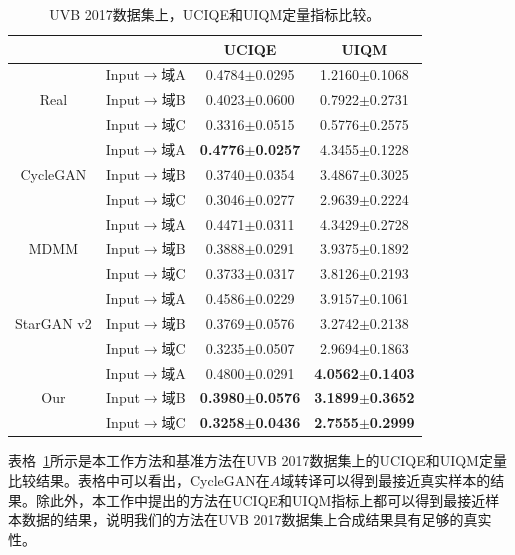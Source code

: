 \begin{table}[htp]
  \centering
  \caption{UVB 2017数据集上，UCIQE和UIQM定量指标比较。}
    \begin{tabular}{c|c|cc}
    \toprule
    \multicolumn{2}{c|}{} & \multicolumn{1}{c}{UCIQE} & UIQM \\
    \midrule
    \multirow{3}[2]{*}{Real} & Input$\rightarrow$域A & 0.4784$\pm$0.0295 & 1.2160$\pm$0.1068 \\
                             & Input$\rightarrow$域B & 0.4023$\pm$0.0600 & 0.7922$\pm$0.2731 \\
                             & Input$\rightarrow$域C & 0.3316$\pm$0.0515 & 0.5776$\pm$0.2575 \\
    \midrule
    \multirow{3}[2]{*}{CycleGAN} & Input$\rightarrow$域A & \textbf{0.4776$\pm$0.0257} & 4.3455$\pm$0.1228 \\
                                 & Input$\rightarrow$域B & 0.3740$\pm$0.0354 & 3.4867$\pm$0.3025 \\
                                 & Input$\rightarrow$域C & 0.3046$\pm$0.0277 & 2.9639$\pm$0.2224  \\
    \midrule
    \multirow{3}[2]{*}{MDMM} & Input$\rightarrow$域A & 0.4471$\pm$0.0311 & 4.3429$\pm$0.2728 \\
          & Input$\rightarrow$域B & 0.3888$\pm$0.0291 & 3.9375$\pm$0.1892 \\
          & Input$\rightarrow$域C & 0.3733$\pm$0.0317 & 3.8126$\pm$0.2193 \\
    \midrule
    \multirow{3}[2]{*}{StarGAN v2} &Input$\rightarrow$域A & 0.4586$\pm$0.0229 & 3.9157$\pm$0.1061 \\
          & Input$\rightarrow$域B & 0.3769$\pm$0.0576 & 3.2742$\pm$0.2138 \\
          & Input$\rightarrow$域C & 0.3235$\pm$0.0507 & 2.9694$\pm$0.1863 \\
    \midrule
    \multirow{3}[2]{*}{Our} & Input$\rightarrow$域A & 0.4800$\pm$0.0291 & \textbf{4.0562$\pm$0.1403} \\
          & Input$\rightarrow$域B & \textbf{0.3980$\pm$0.0576} & \textbf{3.1899$\pm$0.3652} \\
          & Input$\rightarrow$域C & \textbf{0.3258$\pm$0.0436} & \textbf{2.7555$\pm$0.2999} \\
    \bottomrule
    \end{tabular}%
  \label{tab:underwater_matric_uvb}%
\end{table}%

表格~\ref{tab:underwater_matric_uvb}所示是本工作方法和基准方法在UVB 2017数据集上的UCIQE和UIQM定量比较结果。表格中可以看出，CycleGAN在$A$域转译可以得到最接近真实样本的结果。除此外，本工作中提出的方法在UCIQE和UIQM指标上都可以得到最接近样本数据的结果，说明我们的方法在UVB 2017数据集上合成结果具有足够的真实性。

